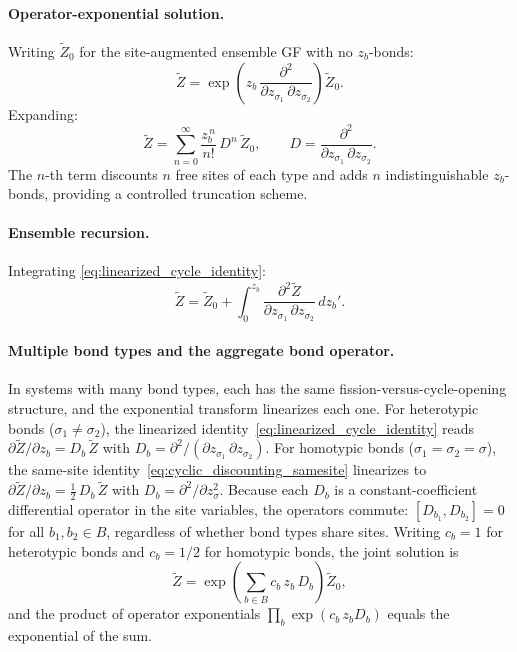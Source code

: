 \documentclass[11pt]{amsart}
\newcommand{\GFensemble}{Z}
\theoremstyle{definition}
\theoremstyle{plain}
\theoremstyle{remark}
\begin{document}
\paragraph{Operator-exponential solution.}
Writing $\widetilde{\GFensemble}_0$ for the site-augmented ensemble GF with no $z_b$-bonds:
\begin{equation}\label{eq:operator_exponential_solution}
\widetilde{\GFensemble} = \exp\!\left(z_b\,\frac{\partial^2}{\partial z_{\sigma_1}\,\partial z_{\sigma_2}}\right)\widetilde{\GFensemble}_0.
\end{equation}
Expanding:
\begin{equation}\label{eq:operator_exponential_series}
\widetilde{\GFensemble}
=
\sum_{n=0}^\infty \frac{z_b^{\,n}}{n!}\,D^n\,\widetilde{\GFensemble}_0,
\qquad D = \frac{\partial^2}{\partial z_{\sigma_1}\,\partial z_{\sigma_2}}.
\end{equation}
The $n$-th term discounts $n$ free sites of each type and adds $n$ indistinguishable $z_b$-bonds, providing a controlled truncation scheme.

\paragraph{Ensemble recursion.}
Integrating \eqref{eq:linearized_cycle_identity}:
\begin{equation}\label{eq:ensemble_recursion_cyclic}
\widetilde{\GFensemble} = \widetilde{\GFensemble}_0 + \int_0^{z_b} \frac{\partial^2\widetilde{\GFensemble}}{\partial z_{\sigma_1}\,\partial z_{\sigma_2}}\,dz_b'.
\end{equation}

\paragraph{Multiple bond types and the aggregate bond operator.}
In systems with many bond types, each has the same fission-versus-cycle-opening structure,
and the exponential transform linearizes each one.
For heterotypic bonds ($\sigma_1\neq\sigma_2$), the linearized identity~\eqref{eq:linearized_cycle_identity} reads $\partial\widetilde{\GFensemble}/\partial z_b = D_b\,\widetilde{\GFensemble}$ with $D_b = \partial^2/(\partial z_{\sigma_1}\,\partial z_{\sigma_2})$.
For homotypic bonds ($\sigma_1=\sigma_2=\sigma$), the same-site identity~\eqref{eq:cyclic_discounting_samesite} linearizes to $\partial\widetilde{\GFensemble}/\partial z_b = \tfrac{1}{2}\,D_b\,\widetilde{\GFensemble}$ with $D_b = \partial^2/\partial z_\sigma^2$.
Because each $D_b$ is a constant-coefficient differential operator in the site variables, the operators commute:
$[D_{b_1},D_{b_2}]=0$ for all $b_1,b_2\in B$, regardless of whether bond types share sites.
Writing $c_b = 1$ for heterotypic bonds and $c_b = 1/2$ for homotypic bonds, the joint solution is
\begin{equation}\label{eq:aggregate_operator_exponential}
\widetilde{\GFensemble}
= \exp\!\left(\sum_{b\in B} c_b\,z_b\,D_b\right)\widetilde{\GFensemble}_0,
\end{equation}
and the product of operator exponentials $\prod_b\exp(c_b\,z_b D_b)$ equals the exponential of the sum.
\end{document}
